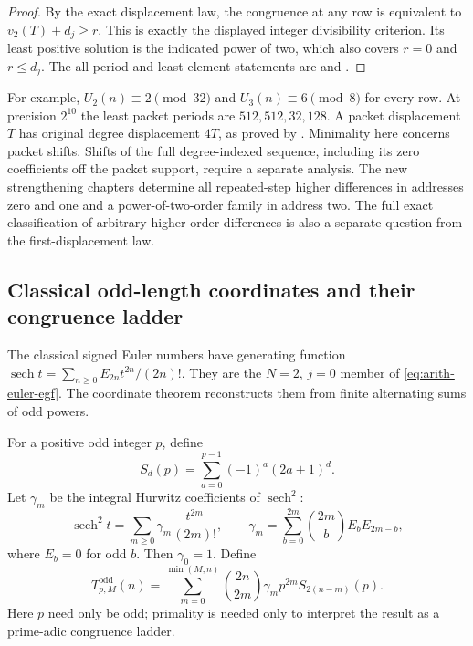 \begin{proof}
By the exact displacement law, the congruence at any row is equivalent to
$v_2(T)+d_j\ge r$.  This is exactly the displayed integer
divisibility criterion.  Its least positive solution is the indicated
power of two, which also covers $r=0$ and $r\le d_j$.
The all-period and least-element statements are
 and
.
\end{proof}

For example, $U_2(n)\equiv2\pmod{32}$ and $U_3(n)\equiv6\pmod8$
for every row.  At precision $2^{10}$ the least packet periods are
$512,512,32,128$.  A packet displacement $T$ has original degree
displacement $4T$, as proved by
.
Minimality here concerns packet shifts.  Shifts of the full degree-indexed
sequence, including its zero coefficients off the packet support, require
a separate analysis.  The new strengthening chapters determine all repeated-step higher differences in addresses zero and one and a power-of-two-order family in address two. The full exact classification of arbitrary higher-order differences
is also a separate question from the first-displacement law.

\subsection{Classical odd-length coordinates and their congruence ladder}

The classical signed Euler numbers have generating function
$\operatorname{sech}t=\sum_{n\ge0}E_{2n}t^{2n}/(2n)!$.
They are the $N=2$, $j=0$ member of
\eqref{eq:arith-euler-egf}.  The coordinate theorem reconstructs
them from finite alternating sums of odd powers.

\begin{definition}
\label{def:arith-odd-source}
For a positive odd integer $p$, define
\[
 S_d(p)=\sum_{a=0}^{p-1}(-1)^a(2a+1)^d.
\]
Let $\gamma_m$ be the integral Hurwitz coefficients of $\operatorname{sech}^2$:
\[
 \operatorname{sech}^2t=\sum_{m\ge0}\gamma_m\frac{t^{2m}}{(2m)!},
 \qquad
 \gamma_m=\sum_{b=0}^{2m}\binom{2m}{b}E_bE_{2m-b},
\]
where $E_b=0$ for odd $b$.  Then $\gamma_0=1$.  Define
\[
 T^{\mathrm{odd}}_{p,M}(n)=\sum_{m=0}^{\min(M,n)}
       \binom{2n}{2m}\gamma_m p^{2m}S_{2(n-m)}(p).
\]
Here $p$ need only be odd; primality is needed only to interpret the
result as a prime-adic congruence ladder.
\end{definition}

